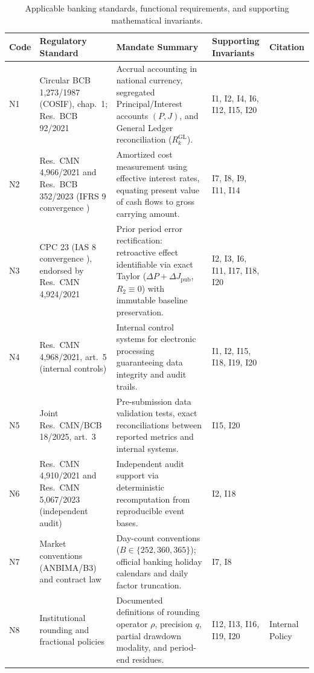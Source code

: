 \documentclass[11pt, a4paper]{article}
\theoremstyle{definition}
\theoremstyle{plain}
\theoremstyle{remark}
\begin{document}
\begin{table}[htbp]
\centering
\footnotesize
\renewcommand{\arraystretch}{1.25}
\begin{tabularx}{\textwidth}{@{}l >{\raggedright\arraybackslash}p{3.6cm} X >{\raggedright\arraybackslash}p{2.4cm} l@{}}
\toprule
\textbf{Code} & \textbf{Regulatory Standard} & \textbf{Mandate Summary} & \textbf{Supporting Invariants} & \textbf{Citation} \\
\midrule
N1 & Circular BCB 1,273/1987 (COSIF), chap.\ 1; Res.\ BCB 92/2021 & Accrual accounting in national currency, segregated Principal/Interest accounts $(P, J)$, and General Ledger reconciliation ($R_k^{\text{GL}}$). & I1, I2, I4, I6, I12, I15, I20 & \cite{N1} \\
N2 & Res.\ CMN 4,966/2021 and Res.\ BCB 352/2023 (IFRS 9 convergence \cite{IASB}) & Amortized cost measurement using effective interest rates, equating present value of cash flows to gross carrying amount. & I7, I8, I9, I11, I14 & \cite{N2, IASB} \\
N3 & CPC 23 (IAS 8 convergence \cite{IASB}), endorsed by Res.\ CMN 4,924/2021 & Prior period error rectification: retroactive effect identifiable via exact Taylor ($\Delta P + \Delta J_{\text{pub}}$, $R_2\equiv 0$) with immutable baseline preservation. & I2, I3, I6, I11, I17, I18, I20 & \cite{N3, IASB} \\
N4 & Res.\ CMN 4,968/2021, art.\ 5 (internal controls) & Internal control systems for electronic processing guaranteeing data integrity and audit trails. & I1, I2, I15, I18, I19, I20 & \cite{N4} \\
N5 & Joint Res.\ CMN/BCB 18/2025, art.\ 3 & Pre-submission data validation tests, exact reconciliations between reported metrics and internal systems. & I15, I20 & \cite{N5} \\
N6 & Res.\ CMN 4,910/2021 and Res.\ CMN 5,067/2023 (independent audit) & Independent audit support via deterministic recomputation from reproducible event bases. & I2, I18 & \cite{N6} \\
N7 & Market conventions (ANBIMA/B3) and contract law & Day-count conventions ($B \in \{252, 360, 365\}$); official banking holiday calendars and daily factor truncation. & I7, I8 & \cite{N7, AssafNeto, Fabozzi2006, ISDA2006} \\
N8 & Institutional rounding and fractional policies & Documented definitions of rounding operator $\rho$, precision $q$, partial drawdown modality, and period-end residues. & I12, I13, I16, I19, I20 & Internal Policy \\
\bottomrule
\end{tabularx}
\caption{Applicable banking standards, functional requirements, and supporting mathematical invariants.}
\label{tab:9}
\end{table}
\end{document}

